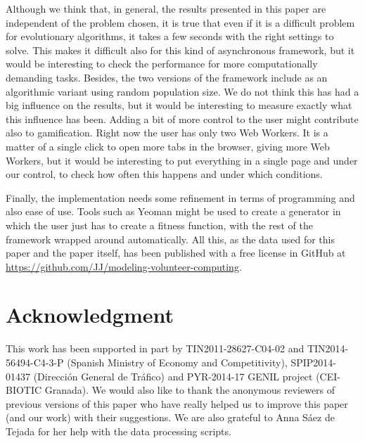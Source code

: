 \documentclass[journal,onecolumn]{IEEEtran}
\begin{document}
Although we think that, in general, the results presented in this
paper are independent of the problem chosen, it is true that even if
it is a difficult problem for evolutionary algorithms, it takes a few
seconds with the right settings to solve. This makes it difficult also
for this kind of asynchronous framework, but it would be interesting
to check the performance for more computationally demanding
tasks. Besides, the two versions of the framework include as an
algorithmic variant using random population size. We do not think this
has had a big influence on the results, but it would be interesting to
measure exactly what this influence has been. Adding a bit of more
control to the user might contribute also to gamification. Right now
the user has only two Web Workers. It is a matter of a single click to
open more tabs in the browser, giving more Web Workers, but it would be
interesting to put everything in a single page and under our control,
to check how often this happens and under which conditions. 

Finally, the implementation needs some refinement in terms of
programming and also ease of use. Tools such as Yeoman might be used %
to create a generator in which the user just has to create a fitness
function, with the rest of the framework wrapped around
automatically. All this, as the data used for this paper and the paper
itself, has been published with a free license in GitHub at
\url{https://github.com/JJ/modeling-volunteer-computing}.  

\section*{Acknowledgment}

This work has been supported in part by TIN2011-28627-C04-02 and
TIN2014-56494-C4-3-P (Spanish Ministry of Economy and Competitivity),
SPIP2014-01437 (Direcci{\'o}n General de Tr{\'a}fico) and PYR-2014-17
GENIL project (CEI-BIOTIC Granada). We would also like to thank the
anonymous reviewers of previous versions of this paper who have really
helped us to improve 
this paper (and our work) with their suggestions. We are also grateful
to Anna S\'aez de Tejada for her help with the data processing scripts.



\end{document}
